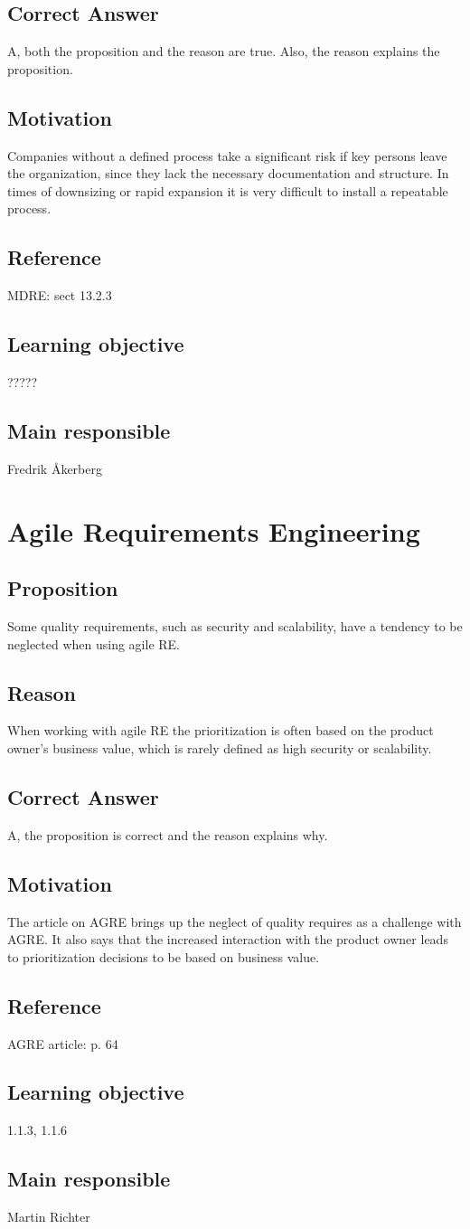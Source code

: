 \documentclass[a4paper]{article}
\begin{document}
\subsection*{Correct Answer}
A, both the proposition and the reason are true. Also, the reason explains the proposition.
\subsection*{Motivation}
Companies without a defined process take a significant risk if key persons leave the organization, since they lack the necessary documentation and structure. In times of downsizing or rapid expansion it is very difficult to install a repeatable process.
\subsection*{Reference}
MDRE: sect 13.2.3
\subsection*{Learning objective}
?????
\subsection*{Main responsible}
 Fredrik Åkerberg
 
\section{Agile Requirements Engineering}
\subsection*{Proposition}
Some quality requirements, such as security and scalability, have a tendency to be neglected when using agile RE. 
\subsection*{Reason}
When working with agile RE the prioritization is often based on the product owner's business value, which is rarely defined as high security or scalability.
\subsection*{Correct Answer}
A, the proposition is correct and the reason explains why.
\subsection*{Motivation}
The article on AGRE brings up the neglect of quality requires as a challenge with AGRE. It also says that the increased interaction with the product owner leads to prioritization decisions to be based on business value.
\subsection*{Reference}
AGRE article: p. 64
\subsection*{Learning objective}
1.1.3, 1.1.6
\subsection*{Main responsible}
Martin Richter
\end{document}
